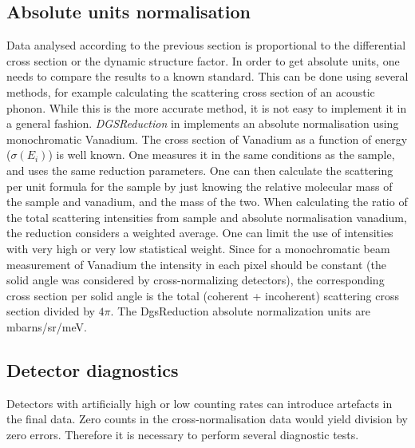  
\subsection{Absolute units normalisation}
Data analysed according to the previous section is proportional to the differential cross section or the dynamic structure factor. In order to get absolute units, one needs to compare the results to a known standard. This can be done using several methods, for example calculating the scattering cross section of an acoustic phonon. While this is the more accurate method, it is not easy to implement it in a general fashion. \textit{DGSReduction} in \mantid{} implements an absolute normalisation using monochromatic Vanadium. The cross section of Vanadium as a function of energy ($\sigma(E_i)$) is well known. One measures it in the same conditions as the sample, and uses the same reduction parameters. One can then calculate the scattering per unit formula for the sample by just knowing the relative molecular mass of the sample and vanadium, and the mass of the two. When calculating the ratio of the total scattering intensities from sample and absolute normalisation vanadium, the reduction considers a weighted average. One can limit the use of intensities with very high or very low statistical weight. Since for a monochromatic beam measurement of Vanadium the intensity in each pixel should be constant (the solid angle was considered by cross-normalizing detectors), the corresponding cross section per solid angle is the total (coherent + incoherent) scattering cross section divided by $4\pi$. The DgsReduction absolute normalization units are mbarns/sr/meV.


\subsection{Detector diagnostics}\label{sec:Physics-detdiag}
Detectors with artificially high or low counting rates can introduce artefacts in the final data. Zero counts in the cross-normalisation data would yield division by zero errors. Therefore it is necessary to perform several diagnostic tests.

